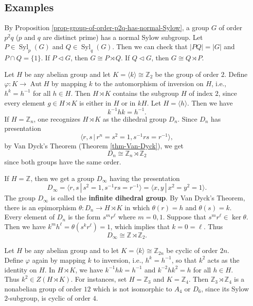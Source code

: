 \subsection{Examples}
\begin{example}
	By Proposition \ref{prop-group-of-order-p2q-has-normal-Sylow}, a group $G$ of order $p^2q$ ($p$ and $q$ are distinct prime) has a normal Sylow subgroup. Let $P\in\operatorname{Syl}_p(G)$ and $Q\in\operatorname{Syl}_q(G)$. Then we can check that $|PQ| = |G|$ and $P\cap Q = \{1\}$. If $P\lhd G$, then $G \cong P\rtimes Q$. If $Q\lhd G$, then $G \cong Q\rtimes P$.
\end{example}
\begin{example}
	 Let $H$ be any abelian group and let $K = \langle k \rangle \cong \mathbb{Z}_2$ be the group of order $2$. Define $\varphi : K \rightarrow \operatorname{Aut}H$ by
	 mapping $k$ to the automorphism of inversion on $H$, i.e.,  $h^k = h^{-1}$ for all $h \in H$. Then $H\rtimes K$ contains the subgroup $H$ of index $2$, since every element $g\in H\rtimes K$ is either in $H$ or in $kH$. Let $H = \langle h\rangle$. Then we have $$k^{-1}hk = h^{-1}.$$  If $H = \mathbb{Z}_n $, one recognizes $H\rtimes K$ as the dihedral group $D_{n}$. Since $D_n$ has presentation $$\langle r,s\,|\, r^n = s^2 = 1, s^{-1}rs= r^{-1}\rangle,$$ by  Van Dyck's Theorem (Theorem \ref{thm-Van-Dyck}), we get
	$$D_n \cong \mathbb{Z}_n\rtimes \mathbb{Z}_2$$
	since both groups have the same order.
	
	 If $H = \mathbb{Z}$, then we get a group  $D_{\infty}$ having the presentation
	 \begin{equation*}
	 	D_{\infty} = \langle r,s\,|\,  s^2 = 1, s^{-1}rs= r^{-1}\rangle  = \langle x,y \,|\, x^2 = y^2 = 1\rangle.
	 \end{equation*} The group $D_{\infty}$  is called the \textbf{infinite dihedral group}. By  Van Dyck's Theorem, there is an epimorphism $\theta:D_n\rightarrow H\rtimes K$ in which $\theta(r) =  h$ and $\theta(s)= k$. Every element of $D_n$ is the form $s^m r^\ell$ where $m=0, 1$. Suppose that $s^m r^\ell \in\ker \theta$. Then  we have  $ k^m h^\ell = \theta(s^k r^\ell)= 1$, which implies that  $k=0=\ell$. Thus 
	 \begin{equation*}
	 	D_{\infty} \cong \mathbb{Z}\rtimes \mathbb{Z}_2.
	 \end{equation*} 
\end{example}




	
\begin{example}
 Let $H$ be any abelian group and to let $K = \langle k \rangle \cong \mathbb{Z}_{2n}$ be cyclic of order $2n$. Define $\varphi$ again by mapping $k$ to inversion, i.e., $h^k = h^{-1}$, so that $k^2$ acts as the identity on $H$. In $H\rtimes K$, we have $k^{-1}hk = h^{-1}$ and $k^{-2}hk^2 = h$ for all $h \in H$. Thus $k^2 \in Z(H\rtimes K)$. For instances, set $H = \mathbb{Z}_3$ and $K = \mathbb{Z}_4$. Then $\mathbb{Z}_3 \rtimes \mathbb{Z}_4$ is a nonabelian group of order $12$ which is not isomorphic to $A_4$ or $D_{6}$, since its Sylow $2$-subgroup,  is cyclic of order $4$.
 
 
\end{example}

